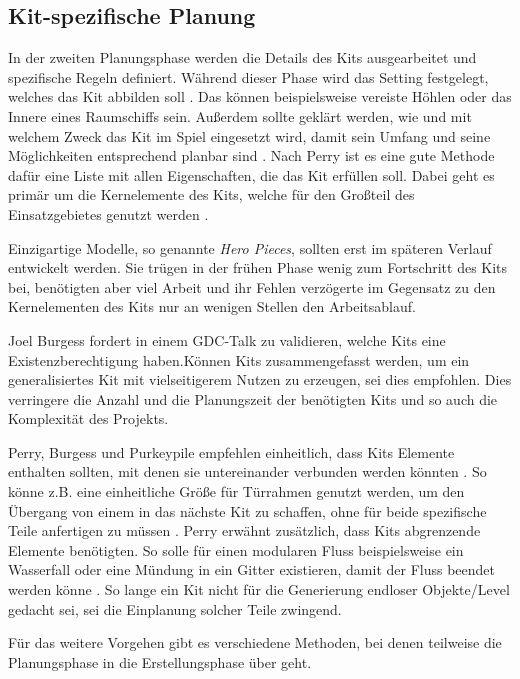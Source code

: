 \subsection{Kit-spezifische Planung}\label{Kit Spezifische Planung}
In der zweiten Planungsphase werden die Details des Kits ausgearbeitet und spezifische Regeln definiert. Während dieser Phase wird das Setting festgelegt, welches das Kit abbilden soll \parencite{Burgess}. Das können beispielsweise vereiste Höhlen oder das Innere eines Raumschiffs sein. Außerdem sollte geklärt werden, wie und mit welchem Zweck das Kit im Spiel eingesetzt wird, damit sein Umfang und seine Möglichkeiten entsprechend planbar sind \parencite{Burgess}. Nach Perry ist es eine gute Methode dafür eine Liste mit allen Eigenschaften, die das Kit erfüllen soll. Dabei geht es primär um die Kernelemente des Kits, welche für den Großteil des Einsatzgebietes genutzt werden \parencite{Perry}.
\par
Einzigartige Modelle, so genannte \textit{Hero Pieces}, sollten erst im späteren Verlauf entwickelt werden. Sie trügen in der frühen Phase wenig zum Fortschritt des Kits bei, benötigten aber viel Arbeit und ihr Fehlen verzögerte im Gegensatz zu den Kernelementen des Kits nur an wenigen Stellen den Arbeitsablauf. \parencite{Burgess,Perry}
\par
Joel Burgess fordert in einem GDC-Talk zu validieren, welche Kits eine Existenzberechtigung haben.Können Kits zusammengefasst werden, um ein generalisiertes Kit mit vielseitigerem Nutzen zu erzeugen, sei dies empfohlen. Dies verringere die Anzahl und die Planungszeit der benötigten Kits und so auch die Komplexität des Projekts. \parencite{Fallout4}
\par
Perry, Burgess und Purkeypile empfehlen einheitlich, dass Kits Elemente enthalten sollten, mit denen sie untereinander verbunden werden könnten \parencite{Burgess,Perry}. So könne z.B. eine einheitliche Größe für Türrahmen genutzt werden, um den Übergang von einem in das nächste Kit zu schaffen, ohne für beide spezifische Teile anfertigen zu müssen \parencite{Burgess}.
Perry erwähnt zusätzlich, dass Kits abgrenzende Elemente benötigten. So solle für einen modularen Fluss beispielsweise ein Wasserfall oder eine Mündung in ein Gitter existieren, damit der Fluss beendet werden könne \parencite{Perry}. So lange ein Kit nicht für die Generierung endloser Objekte/Level gedacht sei, sei die Einplanung solcher Teile zwingend.
\par
Für das weitere Vorgehen gibt es verschiedene Methoden, bei denen teilweise die Planungsphase in die Erstellungsphase über geht.

